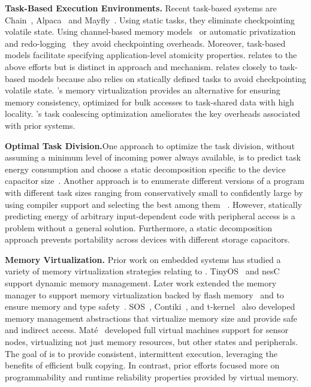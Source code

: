 \textbf{Task-Based Execution Environments.} Recent task-based systems are Chain~\cite{chain}, Alpaca~\cite{alpaca} and Mayfly~\cite{hester_sensys_2017}. Using static tasks, they eliminate checkpointing volatile state. Using channel-based memory models~\cite{chain,hester_sensys_2017} or automatic privatization and redo-logging~\cite{alpaca} they avoid checkpointing overheads. Moreover, task-based models facilitate specifying application-level atomicity properties. \sys relates to the above efforts but is distinct in approach and mechanism. \sys relates closely to task-based models because \sys also relies on statically defined tasks to avoid checkpointing volatile state. 
\sys's memory virtualization provides an alternative for ensuring memory consistency, optimized for bulk accesses to task-shared data with high locality. \sys's task coalescing optimization ameliorates the key overheads associated with prior systems.

\textbf{Optimal Task Division.}One approach to optimize the task division, without assuming a minimum level of
incoming power always available, is to predict task energy consumption and
choose a static decomposition specific to the device capacitor size~\cite{cleancut_2018}. Another approach is to enumerate different versions of a program with different task sizes ranging from conservatively small to confidently large by using compiler support and selecting the best among them ~\cite{baghsorkhi_cgo_2018}. However, statically predicting energy of arbitrary input-dependent code with peripheral access is a problem without a general solution. Furthermore, a static decomposition approach prevents portability across devices with different storage capacitors.




\textbf{Memory Virtualization.} Prior work on embedded systems has studied a variety of memory virtualization strategies relating to \sys. TinyOS~\cite{levis2005tinyos} and nesC~\cite{nesc} support dynamic memory management. Later work extended the memory manager to support memory virtualization backed by flash memory~\cite{sensornetvm} and to ensure memory and type safety~\cite{tinyosmemorysafety}. SOS~\cite{sos}, Contiki~\cite{contiki}, and
t-kernel~\cite{tkernel} also developed memory management abstractions that
virtualize memory size and provide safe and indirect access. Mat\'e~\cite{mate} developed full virtual machines support for sensor nodes, virtualizing not just memory resources, but other states and peripherals. The goal of \sys is to provide consistent, intermittent execution, leveraging the benefits of efficient bulk copying. In contrast, prior efforts focused more on programmability and runtime reliability properties provided by virtual memory.

